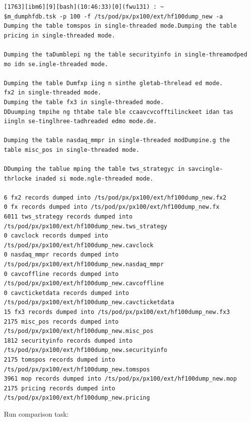 \documentclass[8pt,]{article}
\begin{document}
\begin{verbatim}
[1763][ibm6][9][bash](10:46:33)[0](fwu131) : ~
$m_dumphfdb.tsk -p 100 -f /ts/pod/px/px100/ext/hf100dump_new -a
Dumping the table tomspos in single-threaded mode.Dumping the table pricing in single-threaded mode.

Dumping the taDumblepi ng the table securityinfo in single-threamodped mo idn se.ingle-threaded mode.

Dumping the table Dumfxp iing n sinthe gletab-threlead ed mode.
fx2 in single-threaded mode.
Dumping the table fx3 in single-threaded mode.
DDuumping tmpihe ng thtabe tale ble ccaavcvcofftilinckeet idan tas iingln se-tinglhree-tadhreaded edmo mode.de.

Dumping the table nasdaq_mmpr in single-threaded modDumpine.g the table misc_pos in single-threaded mode.

DDumping the tablue mping the table tws_strategyc in savcingle-thrlocke inaded si mode.ngle-threaded mode.

6 fx2 records dumped into /ts/pod/px/px100/ext/hf100dump_new.fx2
0 fx records dumped into /ts/pod/px/px100/ext/hf100dump_new.fx
6011 tws_strategy records dumped into /ts/pod/px/px100/ext/hf100dump_new.tws_strategy
0 cavclock records dumped into /ts/pod/px/px100/ext/hf100dump_new.cavclock
0 nasdaq_mmpr records dumped into /ts/pod/px/px100/ext/hf100dump_new.nasdaq_mmpr
0 cavcoffline records dumped into /ts/pod/px/px100/ext/hf100dump_new.cavcoffline
0 cavcticketdata records dumped into /ts/pod/px/px100/ext/hf100dump_new.cavcticketdata
15 fx3 records dumped into /ts/pod/px/px100/ext/hf100dump_new.fx3
2175 misc_pos records dumped into /ts/pod/px/px100/ext/hf100dump_new.misc_pos
1812 securityinfo records dumped into /ts/pod/px/px100/ext/hf100dump_new.securityinfo
2175 tomspos records dumped into /ts/pod/px/px100/ext/hf100dump_new.tomspos
3961 mop records dumped into /ts/pod/px/px100/ext/hf100dump_new.mop
2175 pricing records dumped into /ts/pod/px/px100/ext/hf100dump_new.pricing
\end{verbatim}

Run comparison task:
\end{document}
